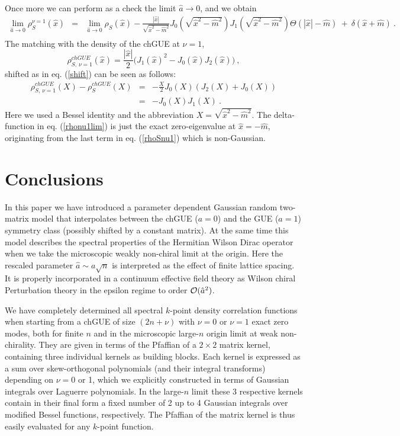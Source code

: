 \documentclass[11pt]{article}
\newcommand{\be}{\begin{equation}}
\newcommand{\ee}{\end{equation}}
\newcommand{\bea}{\begin{eqnarray}}
\newcommand{\eea}{\end{eqnarray}}
\newcommand{\nn}{\nonumber}
\newcommand{\hm}{\hat{m}}
\newcommand{\hx}{\hat{x}}
\newcommand{\ha}{\hat{a}}
\newcommand{\sect}[1]{\setcounter{equation}{0}\section{#1}}
\begin{document}
Once more we can perform as a check the limit $\ha\to0$, and we obtain
\bea
\lim_{\ha\to0}\rho_S^{\nu=1}(\hx)&=&
\lim_{\ha\to0}\rho_S(\hx)-\frac{|\hx|}{\sqrt{\hx^2-\hm^2}}
J_0\left(\sqrt{\hx^2-\hm^2}\right)
J_1\left(\sqrt{\hx^2-\hm^2}\right)\Theta(|\hx|-\hm)
\ +\ \delta(\hx+\hm)\ .\nn\\
\label{rhonu1lim}
\eea
The matching with the density of the chGUE at $\nu=1$,
\be
\rho_{S,\,\nu=1}^{chGU\!E}(\hx)=\frac{|\hx|}{2}
\Big( J_1(\hx)^2-J_0(\hx)J_2(\hx)\Big)\ ,
\label{rhoBesnu1}
\ee
shifted as in eq. (\ref{shift}) can be seen as follows:
\bea
\rho_{S,\,\nu=1}^{chGU\!E}(X)-\rho_{S}^{chGU\!E}(X)&=&
-\frac{X}{2}J_0(X)(J_2(X)+J_0(X))
\nn\\
&=&-J_0(X)J_1(X)\ .
\eea
Here we used a Bessel identity and the abbreviation $X=\sqrt{\hx^2-\hm^2}$. The
delta-function in eq. (\ref{rhonu1lim}) 
is just the exact zero-eigenvalue at $\hx=-\hm$, originating from the
last term in eq. (\ref{rhoSnu1}) which is non-Gaussian.


\sect{Conclusions}\label{conc}

In this paper we have introduced a parameter dependent Gaussian random
two-matrix model that interpolates between the chGUE ($a=0$) and the GUE
($a=1$) symmetry class (possibly shifted by a constant matrix). 
At the same time this model describes the
spectral properties of the Hermitian Wilson Dirac operator 
when we take the microscopic weakly non-chiral limit at the origin. Here the
rescaled parameter $\ha\sim a \sqrt{n}$ is interpreted as the effect
of finite lattice
spacing. It is properly incorporated in a continuum effective field
theory as
Wilson chiral Perturbation theory in the epsilon regime to order
${\cal O}(\ha^2)$.  

We have completely determined all spectral $k$-point density
correlation functions when starting from a chGUE of size
$(2n+\nu)$ with $\nu=0$ or $\nu=1$ exact zero modes, 
both for finite $n$ and in the microscopic large-$n$ origin
limit at weak non-chirality. 
They are given in terms of the Pfaffian of a  $2\times 2$
matrix kernel, containing three individual kernels as building
blocks. Each kernel is expressed as a sum over skew-orthogonal
polynomials (and their integral transforms) depending on $\nu=0$ or 1, 
which we explicitly constructed 
in terms of Gaussian integrals over Laguerre polynomials. 
In the large-$n$ limit these 3 respective kernels contain in their final form a
fixed number of 2 up to 4 Gaussian integrals over modified Bessel
functions, respectively. The Pfaffian of the matrix kernel is thus
easily evaluated for any $k$-point function. 
\end{document}
